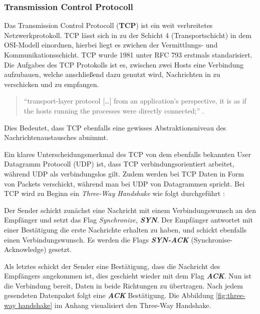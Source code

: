 \documentclass[paper=a4,fontsize=12pt,ngerman]{scrartcl}
\begin{document}
\subsubsection{Transmission Control Protocoll}

Das Transmission Control Protocoll (\textbf{TCP}) ist ein weit verbreitetes Netzwerkprotokoll. 
TCP lässt sich in zu der Schicht 4 (Transportschicht) in dem OSI-Modell einordnen, hierbei liegt es zwichen der Vermittlungs- und Kommunikationsschicht.
\newline TCP wurde 1981 unter RFC 793 erstmals standarisiert. \cite{rfc793}  \newline
Die Aufgabes des TCP Protokolls ist es, zwischen zwei Hosts eine Verbindung aufzubauen, welche anschließend dazu genutzt wird,  
Nachrichten in zu verschicken und zu empfangen.

\begin{quote}
``transport-layer protocol [\dots] from an application’s perspective, it is as if 
the hosts running the processes were directly connected;'' \cite[241]{kr22}.      
\end{quote}


Dies Bedeutet, dass TCP ebenfalls eine gewisses Abstraktionsniveau
des Nachrichtenaustausches abnimmt. 


Ein klares Unterscheidungsmerkmal des TCP von dem ebenfalls bekannten User Datagramm Protocoll (UDP) ist, dass TCP verbindungsorientiert arbeitet, 
während UDP als verbindungslos gilt. Zudem werden bei TCP Daten in Form von Packets verschickt, während man bei UDP von Datagrammen spricht. \newline
Bei TCP wird zu Beginn ein \textit{Three-Way Handshake}
wie folgt durchgeführt : 

Der Sender schickt zunächst eine Nachricht mit einem Verbindungswunsch an den Empfänger und setzt das Flag 
\textit{Synchronize, \textbf{SYN}}.
\newline
Der Empfänger antwortet mit einer Bestätigung die erste Nachrichte erhalten zu haben, und schickt ebenfalls einen 
Verbindungswunsch. Es werden die Flags \textit{\textbf{SYN-ACK}} (Synchronise-Acknowledge) gesetzt.


Als letztes schickt der Sender eine Bestätigung, dass die Nachricht des Empfängers angekommen ist, dies geschieht wieder
mit dem Flag \textit{\textbf{ACK}}. Nun ist die Verbindung bereit, Daten in beide Richtungen zu übertragen.
Nach jedem gesendeten Datenpaket folgt eine \textit{\textbf{ACK}} Bestätigung.
\newline Die Abbildung \ref{fig:three-way handshake} im Anhang visualisiert den Three-Way Handshake.
\end{document}
